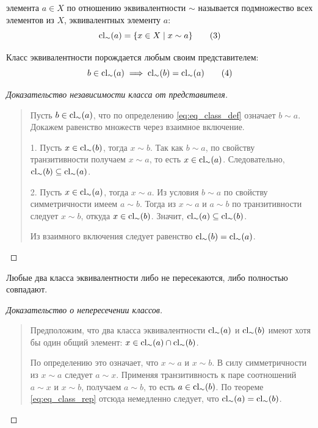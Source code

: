 \begin{definition}
     элемента $a \in X$ по отношению 
    эквивалентности $\sim$ называется подмножество всех элементов из $X$, 
    эквивалентных элементу $a$:
    \begin{equation} \label{eq:eq_class_def}
        \operatorname{cl}_\sim(a) = \{x \in X \mid x \sim a\} \tag{3}
    \end{equation}
\end{definition}

\begin{theorem}
    Класс эквивалентности порождается любым своим представителем:
    \begin{equation} \label{eq:eq_class_rep}
        b \in \operatorname{cl}_\sim(a) \implies \operatorname{cl}_\sim(b) = \operatorname{cl}_\sim(a) \tag{4}
    \end{equation}
\end{theorem}

\begin{proof}[Доказательство независимости класса от представителя]~\\
    \begin{quote}
        Пусть $b \in \operatorname{cl}_\sim(a)$, что по определению \eqref{eq:eq_class_def} 
        означает $b \sim a$. Докажем равенство множеств через взаимное 
        включение.

        1. Пусть $x \in \operatorname{cl}_\sim(b)$, тогда $x \sim b$. Так как $b \sim a$, 
        по свойству транзитивности получаем $x \sim a$, то есть 
        $x \in \operatorname{cl}_\sim(a)$. Следовательно, $\operatorname{cl}_\sim(b) \subseteq \operatorname{cl}_\sim(a)$.

        2. Пусть $x \in \operatorname{cl}_\sim(a)$, тогда $x \sim a$. Из условия $b \sim a$ 
        по свойству симметричности имеем $a \sim b$. Тогда из $x \sim a$ и 
        $a \sim b$ по транзитивности следует $x \sim b$, откуда 
        $x \in \operatorname{cl}_\sim(b)$. Значит, $\operatorname{cl}_\sim(a) \subseteq \operatorname{cl}_\sim(b)$.

        Из взаимного включения следует равенство $\operatorname{cl}_\sim(b) = \operatorname{cl}_\sim(a)$.
    \end{quote}
\end{proof}

\begin{theorem}
    Любые два класса эквивалентности либо не пересекаются, либо полностью 
    совпадают.
\end{theorem}

\begin{proof}[Доказательство о непересечении классов]~\\
    \begin{quote}
        Предположим, что два класса эквивалентности $\operatorname{cl}_\sim(a)$ и 
        $\operatorname{cl}_\sim(b)$ имеют хотя бы один общий элемент: 
        $x \in \operatorname{cl}_\sim(a) \cap \operatorname{cl}_\sim(b)$.

        По определению это означает, что $x \sim a$ и $x \sim b$. В силу 
        симметричности из $x \sim a$ следует $a \sim x$. Применяя 
        транзитивность к паре соотношений $a \sim x$ и $x \sim b$, получаем 
        $a \sim b$, то есть $a \in \operatorname{cl}_\sim(b)$. По теореме 
        \eqref{eq:eq_class_rep} отсюда немедленно следует, что 
        $\operatorname{cl}_\sim(a) = \operatorname{cl}_\sim(b)$.
    \end{quote}
\end{proof}

